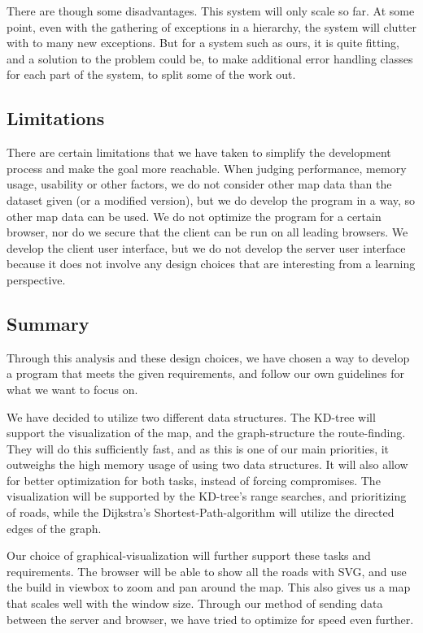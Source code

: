 \documentclass[a4paper,10pt,titlepage]{article}
\begin{document}
There are though some disadvantages. This system will only scale so far. At some point, even with the gathering of exceptions in a hierarchy, the system will clutter with to many new exceptions. But for a system such as ours, it is quite fitting, and a solution to the problem could be, to make additional error handling classes for each part of the system, to split some of the work out.

		\newpage
		\subsection{Limitations}\mbox{}
		There are certain limitations that we have taken to simplify the development process and make the goal more reachable. When judging performance, memory usage, usability or other factors, we do not consider other map data than the dataset given (or a modified version), but we do develop the program in a way, so other map data can be used. We do not optimize the program for a certain browser, nor do we secure that the client can be run on all leading browsers. We develop the client user interface, but we do not develop the server user interface because it does not involve any design choices that are interesting from a learning perspective.
				
		\subsection{Summary}\mbox{}
Through this analysis and these design choices, we have chosen a way to develop a program that meets the given requirements, and follow our own guidelines for what we want to focus on.

We have decided to utilize two different data structures. The KD-tree will support the visualization of the map, and the graph-structure the route-finding. They will do this sufficiently fast, and as this is one of our main priorities, it outweighs the high memory usage of using two data structures. It will also allow for better optimization for both tasks, instead of forcing compromises. The visualization will be supported by the KD-tree's range searches, and prioritizing of roads, while the Dijkstra's Shortest-Path-algorithm will utilize the directed edges of the graph.

Our choice of graphical-visualization will further support these tasks and requirements. The browser will be able to show all the roads with SVG, and use the build in viewbox to zoom and pan around the map. This also gives us a map that scales well with the window size. Through our method of sending data between the server and browser, we have tried to optimize for speed even further.
\end{document}
